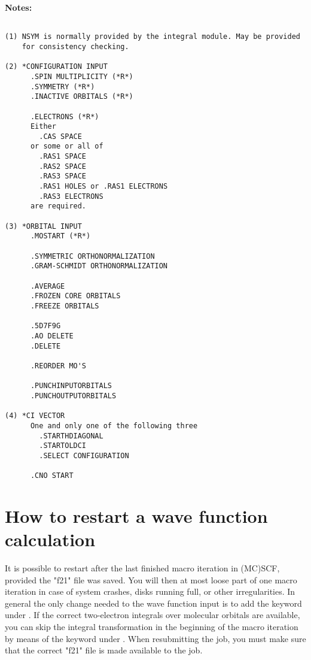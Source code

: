 {\bf Notes:}
 
\begin{verbatim}
 
(1) NSYM is normally provided by the integral module. May be provided
    for consistency checking.

(2) *CONFIGURATION INPUT
      .SPIN MULTIPLICITY (*R*)
      .SYMMETRY (*R*)
      .INACTIVE ORBITALS (*R*)

      .ELECTRONS (*R*)
      Either
        .CAS SPACE
      or some or all of
        .RAS1 SPACE
        .RAS2 SPACE
        .RAS3 SPACE
        .RAS1 HOLES or .RAS1 ELECTRONS
        .RAS3 ELECTRONS
      are required.
 
(3) *ORBITAL INPUT
      .MOSTART (*R*)
 
      .SYMMETRIC ORTHONORMALIZATION
      .GRAM-SCHMIDT ORTHONORMALIZATION
 
      .AVERAGE
      .FROZEN CORE ORBITALS
      .FREEZE ORBITALS
 
      .5D7F9G
      .AO DELETE
      .DELETE
 
      .REORDER MO'S
 
      .PUNCHINPUTORBITALS
      .PUNCHOUTPUTORBITALS
 
(4) *CI VECTOR
      One and only one of the following three
        .STARTHDIAGONAL
        .STARTOLDCI
        .SELECT CONFIGURATION
 
      .CNO START
\end{verbatim}
 
\pagebreak[3]
\section{\label{sec:ig_restart} How to restart a wave function calculation}
 
It is possible to restart after the last finished macro
iteration in 
(MC)SCF, provided the "f21" file was saved.  You will
then at most loose 
part of one macro iteration in case of system crashes, disks running
full, or other irregularities.
\noindent 
In general the only change needed to the wave function input is to add the
 keyword under .
If the correct two-electron
integrals over molecular orbitals are available, you can skip the
integral transformation in the
beginning of the macro iteration by 
means of the  keyword under
.
When resubmitting the job, you must make sure that the correct "f21"
file is made available to the job. 
 
